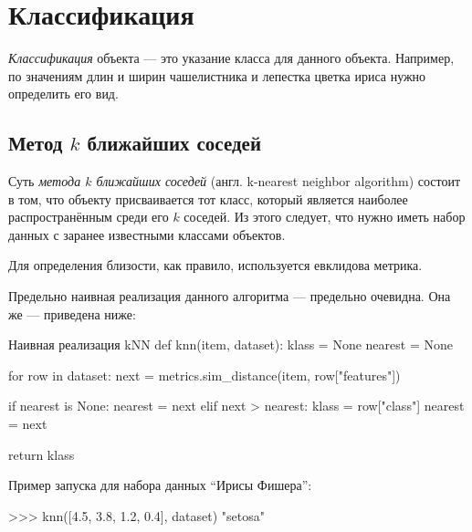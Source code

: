 \section{Классификация}
\emph{Классификация} объекта — это указание класса для данного объекта. Например, по значениям длин и ширин чашелистника и лепестка цветка ириса нужно определить его вид.

\subsection{Метод $k$ ближайших соседей}
Суть \emph{метода $k$ ближайших соседей} (англ. k-nearest neighbor algorithm) состоит в том, что объекту присваивается тот класс, который является наиболее распространённым среди его $k$ соседей. Из этого следует, что нужно иметь набор данных с заранее известными классами объектов.

Для определения близости, как правило, используется евклидова метрика.

Предельно наивная реализация данного алгоритма — предельно очевидна. Она же — приведена ниже:
\begin{pylst}{Наивная реализация kNN}{}
def knn(item, dataset):
    klass = None
    nearest = None

    for row in dataset:
        next = metrics.sim_distance(item, row["features"])

        if nearest is None:
            nearest =  next
        elif next > nearest:
            klass = row["class"]
            nearest = next

    return klass
\end{pylst}

Пример запуска для набора данных ``Ирисы Фишера'':
\begin{pylst}{}{}
>>> knn([4.5, 3.8, 1.2, 0.4], dataset)
"setosa"
\end{pylst}
